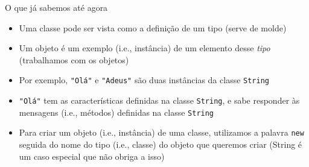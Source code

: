 \documentclass[portuguese, aspectratio=169, xcolor=table]{beamer}
\begin{document}
\begin{frame}{O que já sabemos até agora}
\begin{itemize}
    \item Uma classe pode ser vista como a definição de um tipo (serve de molde)
    \item Um objeto é um exemplo (i.e., instância) de um elemento desse \textit{tipo} (trabalhamos com os objetos)
    \item Por exemplo, \texttt{"Olá"} e \texttt{"Adeus"} são duas instâncias da classe \texttt{String}
    \item \texttt{"Olá"} tem as características definidas na classe \texttt{String}, e sabe responder às mensagens (i.e., métodos) definidas na classe \texttt{String}
    \item Para criar um objeto (i.e., instância) de uma classe, utilizamos a palavra \texttt{new} seguida do nome do tipo (i.e., classe) do objeto que queremos criar (String é um caso especial que não obriga a isso)
\end{itemize}
\end{frame}
\end{document}
